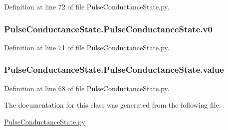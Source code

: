 Definition at line 72 of file Pulse\+Conductance\+State.\+py.

\subsubsection[{\texorpdfstring{v0}{v0}}]{\setlength{\rightskip}{0pt plus 5cm}Pulse\+Conductance\+State.\+Pulse\+Conductance\+State.\+v0}\hypertarget{class_pulse_conductance_state_1_1_pulse_conductance_state_a215539a3eb60e280225053c83f386d79}{}\label{class_pulse_conductance_state_1_1_pulse_conductance_state_a215539a3eb60e280225053c83f386d79}


Definition at line 71 of file Pulse\+Conductance\+State.\+py.

\subsubsection[{\texorpdfstring{value}{value}}]{\setlength{\rightskip}{0pt plus 5cm}Pulse\+Conductance\+State.\+Pulse\+Conductance\+State.\+value}\hypertarget{class_pulse_conductance_state_1_1_pulse_conductance_state_a832cdff7f315b8c16bef00642fb385dd}{}\label{class_pulse_conductance_state_1_1_pulse_conductance_state_a832cdff7f315b8c16bef00642fb385dd}


Definition at line 68 of file Pulse\+Conductance\+State.\+py.



The documentation for this class was generated from the following file\+:\begin{DoxyCompactItemize}
\item 
\hyperlink{_pulse_conductance_state_8py}{Pulse\+Conductance\+State.\+py}\end{DoxyCompactItemize}
